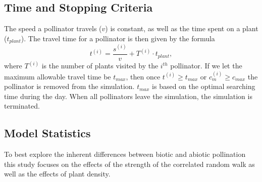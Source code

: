 \subsection{Time and Stopping Criteria}

The speed a pollinator travels ($v$) is constant, as well as the time spent on a
plant ($t_{plant}$).  The travel time for a pollinator is then given by the
formula
\[
  t^{\left(i\right)} = \frac{s^{\left(i\right)}}{v} + T^{\left(i\right)} \cdot t_{plant},
\]
where $T^{\left(i\right)}$ is the number of plants visited by the $i^{th}$
pollinator. If we let the maximum allowable travel time be $t_{max}$, then once
$t^{\left(i\right)} \geq t_{max}$ or $c^{\left(i\right)}_m \geq c_{max}$ the
pollinator is removed from the simulation. $t_{max}$ is based on the optimal
searching time during the day.  When all pollinators leave the simulation, the
simulation is terminated.

\subsection{Model Statistics}

To best explore the inherent differences between biotic and abiotic pollination
this study focuses on the effects of the strength of the correlated random walk
as well as the effects of plant density.

